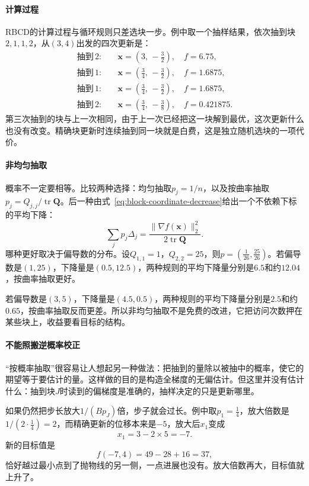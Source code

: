 \paragraph{计算过程}
RBCD的计算过程与循环规则只差选块一步。例中取一个抽样结果，依次抽到块$2,1,1,2$，从$(3,4)$出发的四次更新是：
\[
 \begin{aligned}
 \text{抽到}\,2:&\quad \bm{x}=(3,\,-\tfrac32),\quad f=6.75,\\
 \text{抽到}\,1:&\quad \bm{x}=(\tfrac34,\,-\tfrac32),\quad f=1.6875,\\
 \text{抽到}\,1:&\quad \bm{x}=(\tfrac34,\,-\tfrac32),\quad f=1.6875,\\
 \text{抽到}\,2:&\quad \bm{x}=(\tfrac34,\,-\tfrac38),\quad f=0.421875 .
 \end{aligned}
\]
第三次抽到的块与上一次相同，由于上一次已经把这一块解到最优，这次更新什么也没有改变。精确块更新时连续抽到同一块就是白费，这是独立随机选块的一项代价。

\paragraph{非均匀抽取}
概率不一定要相等。比较两种选择：均匀抽取$p_j=1/n$，以及按曲率抽取$p_j=Q_{j,j}/\operatorname{tr}\bm{Q}$。后一种由式~\eqref{eq:block-coordinate-decrease}给出一个不依赖下标的平均下降：
\begin{equation}
 \sum_{j}p_j\Delta_j=\frac{\lVert\nabla f(\bm{x})\rVert_2^2}{2\operatorname{tr}\bm{Q}} .
 \label{eq:block-curvature-sampling}
\end{equation}
哪种更好取决于偏导数的分布。设$Q_{1,1}=1$，$Q_{2,2}=25$，则$p=(\tfrac1{26},\tfrac{25}{26})$。若偏导数是$(1,25)$，下降量是$(0.5,12.5)$，两种规则的平均下降量分别是$6.5$和约$12.04$，按曲率抽取更好。

若偏导数是$(3,5)$，下降量是$(4.5,0.5)$，两种规则的平均下降量分别是$2.5$和约$0.65$，按曲率抽取反而更差。所以非均匀抽取不是免费的改进，它把访问次数押在某些块上，收益要看目标的结构。

\paragraph{不能照搬逆概率校正}
“按概率抽取”很容易让人想起另一种做法：把抽到的量除以被抽中的概率，使它的期望等于要估计的量。这样做的目的是构造全梯度的无偏估计。但这里并没有估计什么：抽到块$J$时读到的偏梯度是准确的，抽样决定的只是更新哪里。

如果仍然把步长放大$1/(Bp_J)$倍，步子就会过长。例中取$p_1=\tfrac14$，放大倍数是$1/(2\cdot\tfrac14)=2$，而精确更新的位移本来是$-5$，放大后$x_1$变成
\[
 x_1=3-2\times5=-7 .
\]
新的目标值是
\[
 f(-7,4)=49-28+16=37,
\]
恰好越过最小点到了抛物线的另一侧，一点进展也没有。放大倍数再大，目标值就上升了。

